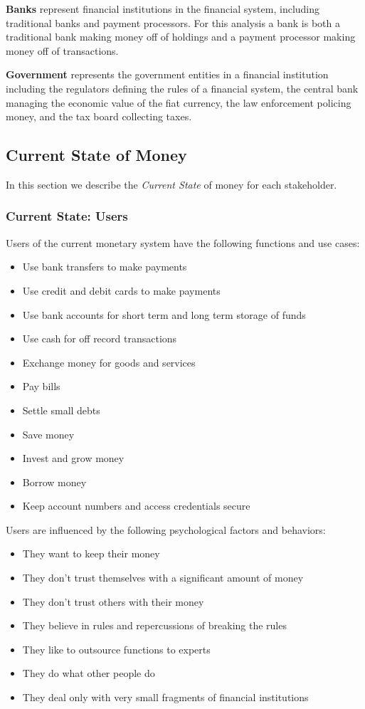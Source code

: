 \documentclass[12pt]{article} %
\begin{document}
{\textbf{Banks} represent financial institutions in the financial system, including traditional banks and payment processors. For this analysis a bank is both a traditional bank making money off of holdings and a payment processor making money off of transactions.

\textbf{Government} represents the government entities in a financial institution including the regulators defining the rules of a financial system, the central bank managing the economic value of the fiat currency, the law enforcement policing money, and the tax board collecting taxes.

\subsection{Current State of Money} \label{ssec:4.3}

In this section we describe the \textit{Current State} of money for each stakeholder.

\subsubsection{Current State: Users} \label{sssec:4.3:users}

Users of the current monetary system have the following functions and use cases:

\begin{itemize}
	\item Use bank transfers to make payments
	\item Use credit and debit cards to make payments
	\item Use bank accounts for short term and long term storage of funds
	\item Use cash for off record transactions
	\item Exchange money for goods and services
	\item Pay bills
	\item Settle small debts
	\item Save money
	\item Invest and grow money
	\item Borrow money
	\item Keep account numbers and access credentials secure
\end{itemize}

Users are influenced by the following psychological factors and behaviors:

\begin{itemize}
	\item They want to keep their money
	\item They don't trust themselves with a significant amount of money
	\item They don't trust others with their money
	\item They believe in rules and repercussions of breaking the rules
	\item They like to outsource functions to experts
	\item They do what other people do
	\item They deal only with very small fragments of financial institutions
\end{itemize}

}
\end{document}
